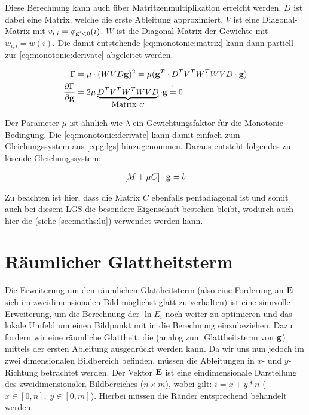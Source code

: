 Diese Berechnung kann auch über Matritzenmultiplikation erreicht werden. $D$ ist dabei eine Matrix, welche die erste Ableitung approximiert. $V$ ist eine Diagonal-Matrix mit $v_{i,i} = \phi_{\mathbf g'<0}(i)$. $W$ ist die Diagonal-Matrix der Gewichte mit $w_{i,i} = w(i)$. Die damit entstehende \autoref{eq:monotonie:matrix} kann dann partiell zur \autoref{eq:monotonie:derivate} abgeleitet werden.

\begin{align}
\label{eq:monotonie:matrix}
\Gamma &= \mu  \cdot (W V  D \mathbf g)^2 = \mu (\mathbf g^T \cdot D^T V^T W^T W V D \cdot \mathbf g)\\
\label{eq:monotonie:derivate}
\frac{\partial \Gamma}{\partial \mathbf g} &= 2 \mu \underbrace{D^T V^T W^T W V D}_{\mbox{Matrix }C}\cdot \mathbf g \overset{!}{=} 0
\end{align}


Der Parameter $\mu$ ist ähnlich wie $\lambda$ ein Gewichtungsfaktor für die Monotonie-Bedingung. Die \autoref{eq:monotonie:derivate} kann damit einfach zum Gleichungssystem aus \ref{eq:g:lgs} hinzugenommen. Daraus entsteht folgendes zu lösende Gleichungssystem:

\begin{align}
\label{eq:g:monotonie}
[M + \mu C] \cdot \mathbf g = b
\end{align}

Zu beachten ist hier, dass die Matrix $C$ ebenfalls pentadiagonal ist und somit auch bei diesem LGS die besondere Eigenschaft bestehen bleibt, wodurch auch hier die  (siehe \autoref{sec:maths:lu}) verwendet werden kann.


\section{Räumlicher Glattheitsterm}
\label{sec:raeumlich}
Die Erweiterung um den räumlichen Glattheitsterm (also eine Forderung an $\mathbf E$ sich im zweidimensionalen Bild möglichst glatt zu verhalten) ist eine sinnvolle Erweiterung, um die Berechnung der $\ln E_i$ noch weiter zu optimieren und das lokale Umfeld um einen Bildpunkt mit in die Berechnung einzubeziehen. Dazu fordern wir eine räumliche Glattheit, die (analog zum Glattheitsterm von $\mathbf g$) mittels der ersten Ableitung ausgedrückt werden kann. Da wir uns nun jedoch im zwei dimensionalen Bildbereich befinden, müssen die Ableitungen in $x$- und $y$-Richtung betrachtet werden. Der Vektor $\mathbf E$ ist eine eindimensionale Darstellung des zweidimensionalen Bildbereiches ($n \times m$), wobei gilt: $i = x+y*n$ ($x \in [0,n], \; y \in [0,m]$). 
Hierbei müssen die Ränder entsprechend behandelt werden.

